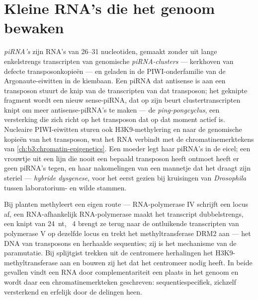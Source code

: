 \section{Kleine RNA's die het genoom bewaken}

\begin{definition}\label{def:b3:rna-regulation:pirna}
\emph{piRNA's} zijn RNA's van \numrange{26}{31} nucleotiden, gemaakt
zonder  uit lange enkelstrengs transcripten van genomische
\emph{piRNA-clusters} --- kerkhoven van defecte transposonkopieën ---
en geladen in de PIWI-onderfamilie van de Argonaute-eiwitten in de
kiembaan. Een piRNA dat antisense is aan een transposon stuurt de knip
van de transcripten van dat transposon; het geknipte fragment wordt een
nieuw sense-piRNA, dat op zijn beurt clustertranscripten knipt om meer
antisense-piRNA's te maken --- de \emph{ping-pongcyclus}, een
versterking die zich richt op het transposon dat op dat moment actief
is. Nucleaire PIWI-eiwitten sturen ook H3K9-methylering en
 naar de genomische kopieën van het transposon, wat het
RNA verbindt met de chromatinemerktekens van
\cref{ch:b3:chromatin-epigenetics}. Een moeder legt haar piRNA's in de
eicel; een vrouwtje uit een lijn die nooit een bepaald transposon heeft
ontmoet heeft er geen piRNA's tegen, en haar nakomelingen van een
mannetje dat het draagt zijn steriel --- \emph{hybride dysgenese}, voor
het eerst gezien bij kruisingen van \emph{Drosophila} tussen
laboratorium- en wilde stammen.
\end{definition}

\begin{proposition}\label{prop:b3:rna-regulation:rddm}
Bij planten methyleert een eigen route --- RNA-polymerase IV schrijft
een locus af, een RNA-afhankelijk RNA-polymerase maakt het transcript
dubbelstrengs, een  knipt  van \qty{24}{nt},
~4 brengt ze terug naar de ontluikende transcripten van
polymerase V op dezelfde locus en trekt het methyltransferase DRM2 aan
--- het DNA van transposons en herhaalde sequenties; zij is het
mechanisme van de paramutatie. Bij splijtgist trekken  uit de
centromere herhalingen het H3K9-methyltransferase aan en bouwen zij
het  dat het centromeer nodig heeft. In beide gevallen
vindt een RNA door complementariteit een plaats in het genoom en wordt
daar een chromatinemerkteken geschreven: sequentiespecifiek,
zichzelf versterkend en erfelijk door de delingen heen.
\end{proposition}


